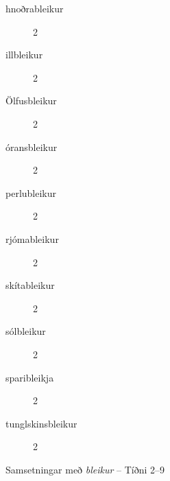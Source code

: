 \documentclass[../samsetningasafn.tex]{subfiles}
\begin{document}
\begin{bigwordlist}
\begin{footnotesize}
\begin{multicols}{4}
\begin{description}
		\item [hnoðrableikur]		2
		\item [illbleikur]		2
		\item [Ölfusbleikur]	2
		\item [óransbleikur]		2
		\item [perlubleikur]		2
		\item [rjómableikur]	2
		\item [skítableikur]	2
		\item [sólbleikur]	2
		\item [sparibleikja]		2
		\item [tunglskinsbleikur]	2
	\end{description}
\end{multicols}
\end{footnotesize}
	
\label{listi:grar9}
\caption{Samsetningar með \textit{bleikur} -- Tíðni 2--9}
\end{bigwordlist}
\end{document}
